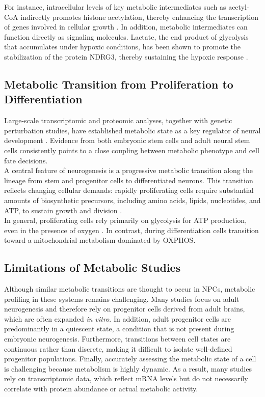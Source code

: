 For instance, intracellular levels of key metabolic intermediates such as acetyl-CoA indirectly promotes histone acetylation, thereby enhancing the transcription of genes involved in cellular growth \citep{CAIAcetylCoAInducesCell2011}.
In addition, metabolic intermediates can function directly as signaling molecules. Lactate, the end product of glycolysis that accumulates under hypoxic conditions, has been shown to promote the stabilization of the protein NDRG3, thereby sustaining the hypoxic response \citep{LEELactateInducedResponseHypoxia2015}.

\subsection{Metabolic Transition from Proliferation to Differentiation}
Large-scale transcriptomic and proteomic analyses, together with genetic perturbation studies, have established metabolic state as a key regulator of neural development \citep{iwataMitochondriaMetabolismSets2023,TARAZONAExploringInfluenceCell2020,ZHENGMetabolicReprogrammingNeuronal2016,OBRIENDifferentiationHumanNeural2015}.
Evidence from both embryonic stem cells and adult neural stem cells consistently points to a close coupling between metabolic phenotype and cell fate decisions.
\\

A central feature of neurogenesis is a progressive metabolic transition along the lineage from stem and progenitor cells to differentiated neurons. This transition reflects changing cellular demands: rapidly proliferating cells require substantial amounts of biosynthetic precursors, including amino acids, lipids, nucleotides, and ATP, to sustain growth and division \citep{ZHANGMetabolicRegulationPluripotent2012,FOLMESSomaticOxidativeBioenergetics2011}.
\\

In general, proliferating cells rely primarily on glycolysis for ATP production, even in the presence of oxygen \citep{METALLOUnderstandingMetabolicRegulation2013}.
In contrast, during differentiation cells transition toward a mitochondrial metabolism dominated by OXPHOS.

\subsection{Limitations of Metabolic Studies}
Although similar metabolic transitions are thought to occur in NPCs, metabolic profiling in these systems remains challenging. Many studies focus on adult neurogenesis and therefore rely on progenitor cells derived from adult brains, which are often expanded \textit{in vitro}.
In addition, adult progenitor cells are predominantly in a quiescent state, a condition that is not present during embryonic neurogenesis. Furthermore, transitions between cell states are continuous rather than discrete, making it difficult to isolate well-defined progenitor populations. Finally, accurately assessing the metabolic state of a cell is challenging because metabolism is highly dynamic. As a result, many studies rely on transcriptomic data, which reflect mRNA levels but do not necessarily correlate with protein abundance or actual metabolic activity.


